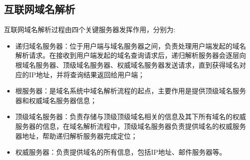 \subsection{互联网域名解析}

互联网域名解析过程由四个关键服务器发挥作用，分别为:
\begin{itemize}
    \item 递归域名服务器：位于用户端与域名服务器之间，负责处理用户端发起的域名解析请求。在接收到用户端发起的域名查询请求后，递归解析服务器会逐层向根域名服务器、顶级域名服务器、权威域名服务器发送请求，直到获得域名对应的IP地址，并将查询结果返回给用户端；
    \item 根服务器：是域名系统中域名解析流程的起点，主要作用是提供顶级域名服务器和权威域名服务器信息；
    \item 顶级域名服务器：负责存储与顶级顶级域名相关的信息及其下所有域名的权威服务器的信息，在域名解析流程中，顶级域名服务器负责提供域名的权威服务器地址，帮助递归解析服务器完成定位；
    \item 权威服务器：负责提供域名的所有信息，包括IP地址、邮件服务器等。
\end{itemize}